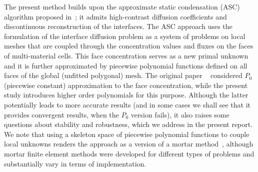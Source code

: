 \documentclass[12pt]{article}
\begin{document}
 The present method builds upon the approximate static condensation (ASC) algorithm proposed in~\cite{kikinzon2017approximate}; it admits high-contrast diffusion coefficients and discontinuous reconstruction of the interfaces. The ASC approach uses the formulation of the interface diffusion problem as a system of problems on local meshes that are coupled through the concentration values and fluxes on the faces of multi-material cells. This face concentration serves as a new primal unknown and it is further approximated by piecewise  polynomial functions defined on all faces of the global (unfitted polygonal) mesh. The original paper ~\cite{kikinzon2017approximate} considered $P_0$ (piecewise constant) approximation to the face concentration, while the present study introduces higher order polynomials for this purpose.
	Although the latter potentially leads to more accurate results  (and in some cases we shall see that it provides convergent results, when the $P_0$ version fails), it also raises some questions about stability and robustness, which we address in the present report.
We note that using a skeleton space of  piecewise polynomial functions to couple local unknowns renders the approach as
a version of a mortar method~\cite{yotov2009mortar,mortar}, although mortar finite element  methods were developed for different types of problems and substantially vary in terms of implementation.
	
\end{document}

